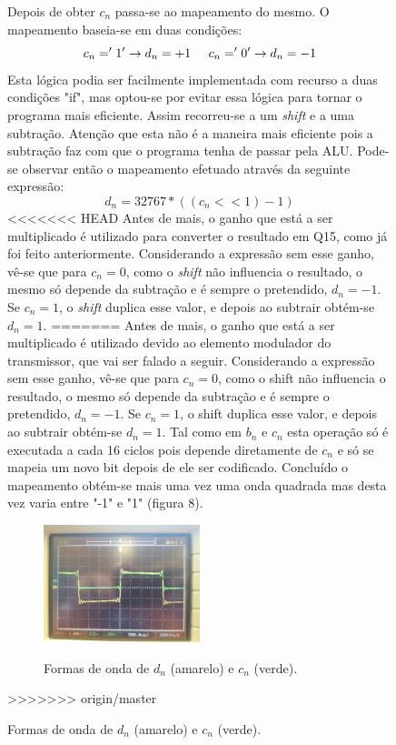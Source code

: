 \documentclass[11pt]{article}
\begin{document}
\begin{figure}[H]
Depois de obter $ c_n $ passa-se ao mapeamento do mesmo. O mapeamento baseia-se em duas condições:
\begin{equation}
	c_n= '1' \rightarrow d_n =+1 \hspace{5 mm} c_n='0' \rightarrow d_n=-1
\end{equation}
Esta lógica podia ser facilmente implementada com recurso a duas condições "if", mas optou-se por evitar essa lógica para tornar o programa mais eficiente.
Assim recorreu-se a um \textit{shift} e a uma subtração. Atenção que esta não é a maneira mais eficiente pois a subtração faz com que o programa tenha de passar pela ALU.
Pode-se observar então o mapeamento efetuado através da seguinte expressão:
\begin{equation}
d_n=32767*((c_n << 1)-1)
\end{equation}
<<<<<<< HEAD
Antes de mais, o ganho que está a ser multiplicado é utilizado para converter o resultado em Q15, como já foi feito anteriormente. Considerando a expressão sem esse ganho, vê-se que para $ c_n=0 $, como o \textit{shift} não influencia o resultado, o mesmo só depende da subtração e é sempre o pretendido, $d_n=-1$. Se $c_n=1$, o \textit{shift} duplica  esse valor, e depois ao subtrair obtém-se $d_n=1$.
=======
Antes de mais, o ganho que está a ser multiplicado é utilizado devido ao elemento modulador do transmissor, que vai ser falado a seguir. Considerando a expressão sem esse ganho, vê-se que para $ c_n=0 $, como o shift não influencia o resultado, o mesmo só depende da subtração e é sempre o pretendido, $d_n=-1$. Se $c_n=1$, o shift duplica  esse valor, e depois ao subtrair obtém-se $d_n=1$.
Tal como em $b_n$ e $c_n$ esta operação só é executada a cada 16 ciclos pois depende diretamente de $c_n$ e só se mapeia um novo bit depois de ele ser codificado. Concluído o mapeamento obtém-se mais uma vez uma onda quadrada mas desta vez varia entre "-1" e "1" (figura 8).

\begin{figure}[H]
	\centering
	\includegraphics[width=0.5\textwidth]{./dn_cn}~\\
	\caption{Formas de onda de $d_n$ (amarelo) e $c_n$ (verde).}
\end{figure}
>>>>>>> origin/master


\end{figure}
\end{document}

